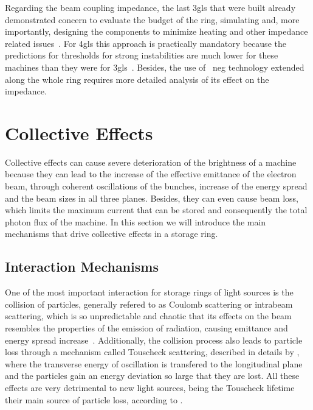     Regarding the beam coupling impedance, the last \gls{3gls} that were built already demonstrated concern to evaluate the budget of the ring, simulating and, more importantly, designing the components to minimize heating and other impedance related issues~\cite{Nagaoka2004a,Gunzel2008,Blednykh2007,Blednykh2009}. For \gls{4gls} this approach is practically mandatory because the predictions for thresholds for strong instabilities are much lower for these machines than they were for \gls{3gls}~\cite{Klein2013a,Lindberg2015,Persichelli2017a,Wang2017,Wang2017a}. Besides, the use of ~\gls{neg} technology extended along the whole ring requires more detailed analysis of its effect on the impedance.

\section{Collective Effects}

    Collective effects can cause severe deterioration of the brightness of a machine because they can lead to the increase of the effective emittance of the electron beam, through coherent oscillations of the bunches, increase of the energy spread and the beam sizes in all three planes. Besides, they can even cause beam loss, which limits the maximum current that can be stored and consequently the total photon flux of the machine. In this section we will introduce the main mechanisms that drive collective effects in a storage ring.

\subsection{Interaction Mechanisms}

    One of the most important interaction for storage rings of light sources is the collision of particles, generally refered to as Coulomb scattering or intrabeam scattering, which is so unpredictable and chaotic that its effects on the beam resembles the properties of the emission of radiation, causing emittance and energy spread increase~\cite{Piwinski1974,Bjorken1983,Kubo2001}. Additionally, the collision process also leads to particle loss through a mechanism called Touscheck scattering, described in details by , where the transverse energy of oscillation is transfered to the longitudinal plane and the particles gain an energy deviation so large that they are lost. All these effects are very detrimental to new light sources, being the Touscheck lifetime their main source of particle loss, according to .

